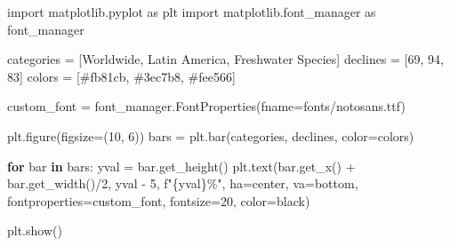 \documentclass[
  letterpaper,
  DIV=11,
  numbers=noendperiod]{scrartcl}
\newenvironment{Shaded}{\begin{snugshade}}{\end{snugshade}}
\newcommand{\ControlFlowTok}[1]{\textcolor[rgb]{0.00,0.23,0.31}{\textbf{#1}}}
\newcommand{\DecValTok}[1]{\textcolor[rgb]{0.68,0.00,0.00}{#1}}
\newcommand{\ImportTok}[1]{\textcolor[rgb]{0.00,0.46,0.62}{#1}}
\newcommand{\KeywordTok}[1]{\textcolor[rgb]{0.00,0.23,0.31}{\textbf{#1}}}
\newcommand{\NormalTok}[1]{\textcolor[rgb]{0.00,0.23,0.31}{#1}}
\newcommand{\OperatorTok}[1]{\textcolor[rgb]{0.37,0.37,0.37}{#1}}
\newcommand{\SpecialCharTok}[1]{\textcolor[rgb]{0.37,0.37,0.37}{#1}}
\newcommand{\SpecialStringTok}[1]{\textcolor[rgb]{0.13,0.47,0.30}{#1}}
\newcommand{\StringTok}[1]{\textcolor[rgb]{0.13,0.47,0.30}{#1}}
\begin{document}
\begin{Shaded}
\begin{Highlighting}[]
\ImportTok{import}\NormalTok{ matplotlib.pyplot }\ImportTok{as}\NormalTok{ plt}
\ImportTok{import}\NormalTok{ matplotlib.font\_manager }\ImportTok{as}\NormalTok{ font\_manager}

\NormalTok{categories }\OperatorTok{=}\NormalTok{ [}\StringTok{\textquotesingle{}Worldwide\textquotesingle{}}\NormalTok{, }\StringTok{\textquotesingle{}Latin America\textquotesingle{}}\NormalTok{, }\StringTok{\textquotesingle{}Freshwater Species\textquotesingle{}}\NormalTok{]}
\NormalTok{declines }\OperatorTok{=}\NormalTok{ [}\DecValTok{69}\NormalTok{, }\DecValTok{94}\NormalTok{, }\DecValTok{83}\NormalTok{]}
\NormalTok{colors }\OperatorTok{=}\NormalTok{ [}\StringTok{\textquotesingle{}\#fb81cb\textquotesingle{}}\NormalTok{, }\StringTok{\textquotesingle{}\#3ec7b8\textquotesingle{}}\NormalTok{, }\StringTok{\textquotesingle{}\#fee566\textquotesingle{}}\NormalTok{]}

\NormalTok{custom\_font }\OperatorTok{=}\NormalTok{ font\_manager.FontProperties(fname}\OperatorTok{=}\StringTok{\textquotesingle{}fonts/notosans.ttf\textquotesingle{}}\NormalTok{)}

\NormalTok{plt.figure(figsize}\OperatorTok{=}\NormalTok{(}\DecValTok{10}\NormalTok{, }\DecValTok{6}\NormalTok{))}
\NormalTok{bars }\OperatorTok{=}\NormalTok{ plt.bar(categories, declines, color}\OperatorTok{=}\NormalTok{colors)}

\ControlFlowTok{for}\NormalTok{ bar }\KeywordTok{in}\NormalTok{ bars:}
\NormalTok{    yval }\OperatorTok{=}\NormalTok{ bar.get\_height()}
\NormalTok{    plt.text(bar.get\_x() }\OperatorTok{+}\NormalTok{ bar.get\_width()}\OperatorTok{/}\DecValTok{2}\NormalTok{, yval }\OperatorTok{{-}} \DecValTok{5}\NormalTok{, }\SpecialStringTok{f"}\SpecialCharTok{\{}\NormalTok{yval}\SpecialCharTok{\}}\SpecialStringTok{\%"}\NormalTok{, ha}\OperatorTok{=}\StringTok{\textquotesingle{}center\textquotesingle{}}\NormalTok{, va}\OperatorTok{=}\StringTok{\textquotesingle{}bottom\textquotesingle{}}\NormalTok{, fontproperties}\OperatorTok{=}\NormalTok{custom\_font, fontsize}\OperatorTok{=}\DecValTok{20}\NormalTok{, color}\OperatorTok{=}\StringTok{\textquotesingle{}black\textquotesingle{}}\NormalTok{)}

\NormalTok{plt.show()}
\end{Highlighting}
\end{Shaded}
\end{document}
